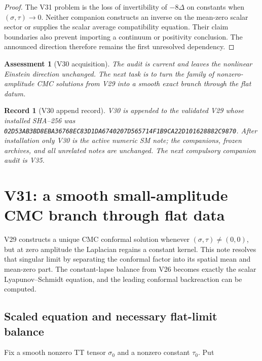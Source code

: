 \documentclass[11pt]{article}
\newtheorem{assessment}[theorem]{Assessment}
\newtheorem{record}[theorem]{Record}
\theoremstyle{remark}
\begin{document}
\begin{proof}
The V31 problem is the loss of invertibility of \(-8\Delta\) on constants
when \((\sigma,\tau)\to0\).  Neither companion constructs an inverse on
the mean-zero scalar sector or supplies the scalar average compatibility
equation.  Their claim boundaries also prevent importing a continuum or
positivity conclusion.  The announced direction therefore remains the
first unresolved dependency.
\end{proof}

\begin{assessment}[V30 acquisition]
\label{ass:v19v30}
The audit is current and leaves the nonlinear Einstein direction
unchanged.  The next task is to turn the family of nonzero-amplitude CMC
solutions from V29 into a smooth exact branch through the flat datum.
\end{assessment}

\begin{record}[V30 append record]
\label{rec:v19v30}
V30 is appended to the validated V29 whose installed SHA--256 was
\texttt{02D53AB3BD8EBA36768EC83D1DA6740207D565714F1B9CA22D101628882C9870}.
After installation only V30 is the active numeric SM note; the companions,
frozen archives, and all unrelated notes are unchanged.  The next
compulsory companion audit is V35.
\end{record}



\section{V31: a smooth small-amplitude CMC branch through flat data}
\label{sec:v19v31}

V29 constructs a unique CMC conformal solution whenever
\((\sigma,\tau)\neq(0,0)\), but at zero amplitude the Laplacian regains a
constant kernel.  This note resolves that singular limit by separating
the conformal factor into its spatial mean and mean-zero part.  The
constant-lapse balance from V26 becomes exactly the scalar
Lyapunov--Schmidt equation, and the leading conformal backreaction can be
computed.

\subsection{Scaled equation and necessary flat-limit balance}

Fix a smooth nonzero TT tensor \(\sigma_0\) and a nonzero constant
\(\tau_0\).  Put
\end{document}
